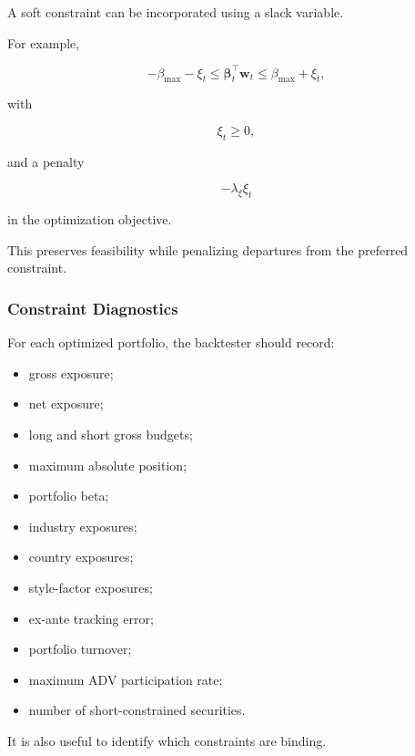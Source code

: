 \documentclass[11pt,a4paper]{article}
\begin{document}
A soft constraint can be incorporated using a slack variable.

For example,

\begin{equation}
-\beta_{\max}-\xi_t
\leq
\boldsymbol{\beta}_t^\top\mathbf{w}_t
\leq
\beta_{\max}+\xi_t,
\end{equation}

with

\begin{equation}
\xi_t\geq0,
\end{equation}

and a penalty

\begin{equation}
-\lambda_{\xi}\xi_t
\end{equation}

in the optimization objective.

This preserves feasibility while penalizing departures from the preferred
constraint.


\subsubsection{Constraint Diagnostics}

For each optimized portfolio, the backtester should record:

\begin{itemize}
    \item gross exposure;
    \item net exposure;
    \item long and short gross budgets;
    \item maximum absolute position;
    \item portfolio beta;
    \item industry exposures;
    \item country exposures;
    \item style-factor exposures;
    \item ex-ante tracking error;
    \item portfolio turnover;
    \item maximum ADV participation rate;
    \item number of short-constrained securities.
\end{itemize}

It is also useful to identify which constraints are binding.
\end{document}
